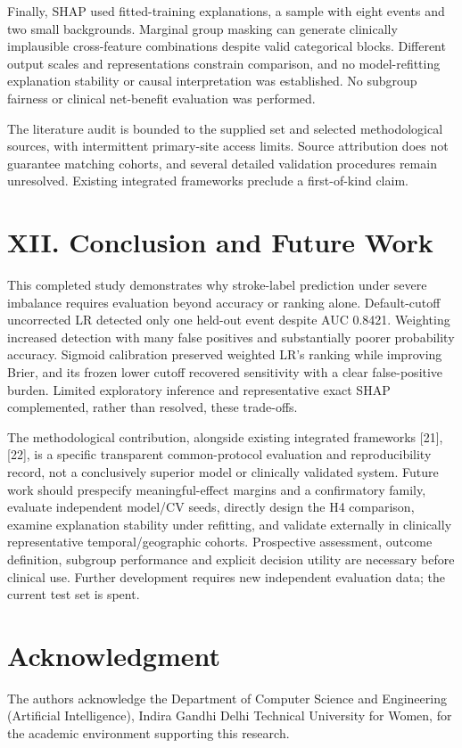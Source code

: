 \documentclass[10pt,twocolumn,letterpaper]{article}
\begin{document}
Finally, SHAP used fitted-training explanations, a sample with eight events and two small backgrounds. Marginal group masking can generate clinically implausible cross-feature combinations despite valid categorical blocks. Different output scales and representations constrain comparison, and no model-refitting explanation stability or causal interpretation was established. No subgroup fairness or clinical net-benefit evaluation was performed.


The literature audit is bounded to the supplied set and selected methodological sources, with intermittent primary-site access limits. Source attribution does not guarantee matching cohorts, and several detailed validation procedures remain unresolved. Existing integrated frameworks preclude a first-of-kind claim.


\section*{XII. Conclusion and Future Work}
This completed study demonstrates why stroke-label prediction under severe imbalance requires evaluation beyond accuracy or ranking alone. Default-cutoff uncorrected LR detected only one held-out event despite AUC 0.8421. Weighting increased detection with many false positives and substantially poorer probability accuracy. Sigmoid calibration preserved weighted LR's ranking while improving Brier, and its frozen lower cutoff recovered sensitivity with a clear false-positive burden. Limited exploratory inference and representative exact SHAP complemented, rather than resolved, these trade-offs.


The methodological contribution, alongside existing integrated frameworks [21], [22], is a specific transparent common-protocol evaluation and reproducibility record, not a conclusively superior model or clinically validated system. Future work should prespecify meaningful-effect margins and a confirmatory family, evaluate independent model/CV seeds, directly design the H4 comparison, examine explanation stability under refitting, and validate externally in clinically representative temporal/geographic cohorts. Prospective assessment, outcome definition, subgroup performance and explicit decision utility are necessary before clinical use. Further development requires new independent evaluation data; the current test set is spent.


\section*{Acknowledgment}
The authors acknowledge the Department of Computer Science and Engineering (Artificial Intelligence), Indira Gandhi Delhi Technical University for Women, for the academic environment supporting this research.
\end{document}
